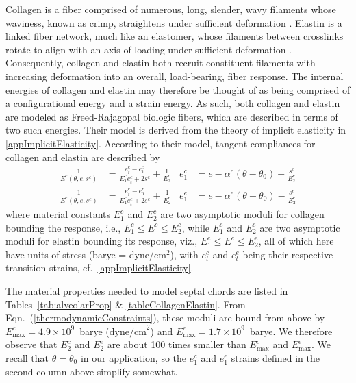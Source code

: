 Collagen is a fiber comprised of numerous, long, slender, wavy filaments whose waviness, known as crimp, straightens under sufficient deformation \cite{Kastelicetal'78,FreedDoehring05}.  Elastin is a linked fiber network, much like an elastomer, whose filaments between crosslinks rotate to align with an axis of loading under sufficient deformation \cite{AaronGosline81,Urry89}.  Consequently, collagen and elastin both recruit constituent filaments with increasing deformation into an overall, load-bearing, fiber response.  The internal energies of collagen and elastin may therefore be thought of as being comprised of a configurational energy and a strain energy.  As such, both collagen and elastin are modeled as Freed-Rajagopal biologic fibers, which are described in terms of two such energies.  Their model is derived from the theory of implicit elasticity in \ref{appImplicitElasticity}.  According to their model, tangent compliances for collagen and elastin are described by
\begin{subequations}
    \label{septalChordModuli}
    \begin{align}
	\frac{1}{E^c (\theta, e, s^c)} & = \frac{e_t^c - e_1^c}{E_1^c e_t^c + 2s^c} + \frac{1}{E_2^c} &
	e_1^c & = e - \alpha^c (\theta - \theta_0) - \frac{s^c}{E_2^c} \\
    \frac{1}{E^e (\theta , e , s^e )} & = \frac{e_t^e - e_1^e}{E_1^e e_t^e + 2s^e} + \frac{1}{E_2^e} &
    e_1^e & = e - \alpha^e (\theta - \theta_0) - \frac{s^e}{E_2^e} 
    \end{align}
\end{subequations}
where material constants $E_1^c$ and $E_2^c$ are two asymptotic moduli for collagen bounding the response, i.e., $E_1^c \leq E^c \leq E^c_2$, while $E_1^e$ and $E_2^e$ are two asymptotic moduli for elastin bounding its response, viz., $E^e_1 \leq E^e \leq E^e_2$, all of which here have units of stress (barye = dyne/$\text{cm}^2$), with $e_t^c$ and $e_t^e$ being their respective transition strains, cf.\ \ref{appImplicitElasticity}. 

The material properties needed to model septal chords are listed in Tables~\ref{tab:alveolarProp} \& \ref{tableCollagenElastin}.  From Eqn.~(\ref{thermodynamicConstraints}), these moduli are bound from above by $E^c_{\max} = 4.9 \times 10^9$~barye ($\text{dyne/cm}^2$) and $E^e_{\max} = 1.7 \times 10^9$~barye.  We therefore observe that $E^c_2$ and $E^e_2$ are about 100 times smaller than $E^c_{\max}$ and $E^e_{\max}$.  We recall that $\theta = \theta_0$ in our application, so the $e^c_1$ and $e^e_1$ strains defined in the second column above simplify somewhat.  

